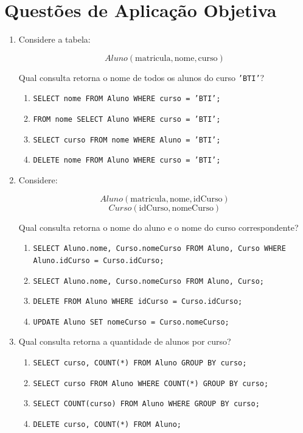 \documentclass[12pt,a4paper]{article}
\begin{document}
\section{Questões de Aplicação Objetiva}

\begin{enumerate}[resume,label=\textbf{Q\arabic*.}]

\item Considere a tabela:

\[
Aluno(\text{matricula}, \text{nome}, \text{curso})
\]

Qual consulta retorna o nome de todos os alunos do curso \texttt{'BTI'}?

\begin{enumerate}[label=\alph*)]
    \item \texttt{SELECT nome FROM Aluno WHERE curso = 'BTI';}
    \item \texttt{FROM nome SELECT Aluno WHERE curso = 'BTI';}
    \item \texttt{SELECT curso FROM nome WHERE Aluno = 'BTI';}
    \item \texttt{DELETE nome FROM Aluno WHERE curso = 'BTI';}
\end{enumerate}

\item Considere:

\[
Aluno(\text{matricula}, \text{nome}, \text{idCurso})
\]
\[
Curso(\text{idCurso}, \text{nomeCurso})
\]

Qual consulta retorna o nome do aluno e o nome do curso correspondente?

\begin{enumerate}[label=\alph*)]
    \item \texttt{SELECT Aluno.nome, Curso.nomeCurso FROM Aluno, Curso WHERE Aluno.idCurso = Curso.idCurso;}
    \item \texttt{SELECT Aluno.nome, Curso.nomeCurso FROM Aluno, Curso;}
    \item \texttt{DELETE FROM Aluno WHERE idCurso = Curso.idCurso;}
    \item \texttt{UPDATE Aluno SET nomeCurso = Curso.nomeCurso;}
\end{enumerate}

\item Qual consulta retorna a quantidade de alunos por curso?

\begin{enumerate}[label=\alph*)]
    \item \texttt{SELECT curso, COUNT(*) FROM Aluno GROUP BY curso;}
    \item \texttt{SELECT curso FROM Aluno WHERE COUNT(*) GROUP BY curso;}
    \item \texttt{SELECT COUNT(curso) FROM Aluno WHERE GROUP BY curso;}
    \item \texttt{DELETE curso, COUNT(*) FROM Aluno;}
\end{enumerate}


\end{enumerate}
\end{document}
